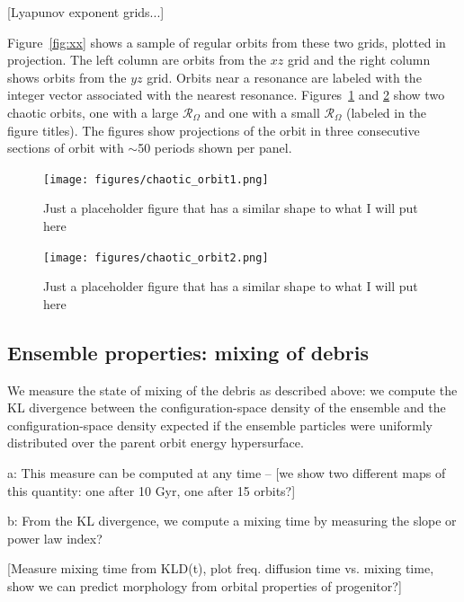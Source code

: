 \documentclass[letterpaper,12pt,preprint]{aastex}
\newcommand{\fdrate}{\mathcal{R}_\Omega}
\begin{document}
[Lyapunov exponent grids...]

Figure~\ref{fig:xx} shows a sample of regular orbits from these two grids, plotted in projection. The left column are orbits from the $xz$ grid and the right column shows orbits from the $yz$ grid. Orbits near a resonance are labeled with the integer vector associated with the nearest resonance. Figures~\ref{fig:chaotic1} and \ref{fig:chaotic2} show two chaotic orbits, one with a large $\fdrate$ and one with a small $\fdrate$ (labeled in the figure titles). The figures show projections of the orbit in three consecutive sections of orbit with $\sim$50 periods shown per panel.

\begin{figure}[!h]
\begin{center}
\texttt{[image: figures/chaotic\_orbit1.png]}
\caption{Just a placeholder figure that has a similar shape to what I will put here} \label{fig:chaotic1}
\end{center}
\end{figure}

\begin{figure}[!h]
\begin{center}
\texttt{[image: figures/chaotic\_orbit2.png]}
\caption{Just a placeholder figure that has a similar shape to what I will put here} \label{fig:chaotic2}
\end{center}
\end{figure}

\subsection{Ensemble properties: mixing of debris}

We measure the state of mixing of the debris as described above: we compute the KL divergence between the configuration-space density of the ensemble and the configuration-space density expected if the ensemble particles were uniformly distributed over the parent orbit energy hypersurface. 

a:
This measure can be computed at any time -- [we show two different maps of this quantity: one after 10 Gyr, one after 15 orbits?]

b: 
From the KL divergence, we compute a mixing time by measuring the slope or power law index?

[Measure mixing time from KLD(t), plot freq. diffusion time vs. mixing time, show we can predict morphology from orbital properties of progenitor?]
\end{document}
